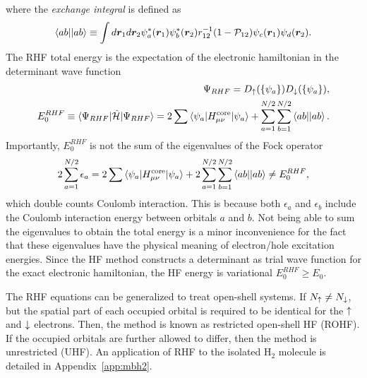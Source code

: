 where the \textit{exchange integral} is defined as
\begin{align}
\braket{ab||ab} \equiv \int d\boldsymbol{r}_1d\boldsymbol{r}_2 \psi_a^*(\boldsymbol{r}_1)\psi_b^*(\boldsymbol{r}_2)r_{12}^{-1}(1-\mathcal{P}_{12})\psi_c(\boldsymbol{r}_1)\psi_d(\boldsymbol{r}_2).
\end{align}
The RHF total energy is the expectation of the electronic hamiltonian in the determinant wave function
\begin{align}
\Psi_{RHF} = D_{\uparrow}(\{\psi_a\}) D_{\downarrow}(\{\psi_a\}), \\
E^{RHF}_0 \equiv \braket{\Psi_{RHF}|\hat{\mathcal{H}}|\Psi_{RHF}} = 2\sum\limits\braket{\psi_a|H^{\text{core}}_{\mu\nu}|\psi_a} + \sum\limits_{a=1}^{N/2}\sum\limits_{b=1}^{N/2} \braket{ab||ab}.
\end{align}
Importantly, $E^{RHF}_0$ is not the sum of the eigenvalues of the Fock operator
\begin{align} \label{eq:hf-esum}
2\sum\limits_{a=1}^{N/2} \epsilon_a = 2\sum\limits\braket{\psi_a|H^{\text{core}}_{\mu\nu}|\psi_a} + 2\sum\limits_{a=1}^{N/2}\sum\limits_{b=1}^{N/2} \braket{ab||ab} \neq E^{RHF}_0,
\end{align}
which double counts Coulomb interaction. This is because both $\epsilon_a$ and $\epsilon_b$ include the Coulomb interaction energy between orbitals $a$ and $b$.
Not being able to sum the eigenvalues to obtain the total energy is a minor inconvenience for the fact that these eigenvalues have the physical meaning of electron/hole excitation energies.
Since the HF method constructs a determinant as trial wave function for the exact electronic hamiltonian, the HF energy is variational $E^{RHF}_0 \ge E_0$.

The RHF equations can be generalized to treat open-shell systems.
If $N_{\uparrow} \neq N_{\downarrow}$, but the spatial part of each occupied orbital is required to be identical for the $\uparrow$ and $\downarrow$ electrons. Then, the method is known as restricted open-shell HF (ROHF).
If the occupied orbitals are further allowed to differ, then the method is unrestricted (UHF).
An application of RHF to the isolated H$_2$ molecule is detailed in Appendix~\ref{app:mbh2}.

